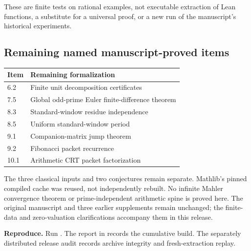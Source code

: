 These are finite tests on rational examples, not executable extraction of Lean functions, a substitute for a universal proof, or a new run of the manuscript's historical experiments.

\subsection*{Remaining named manuscript-proved items}
\begin{center}
\begin{tabular}{@{}ll@{}}\toprule
Item & Remaining formalization\\\midrule
6.2 & Finite unit decomposition certificates\\
7.5 & Global odd-prime Euler finite-difference theorem\\
8.3 & Standard-window residue independence\\
8.5 & Uniform standard-window period\\
9.1 & Companion-matrix jump theorem\\
9.2 & Fibonacci packet recurrence\\
10.1 & Arithmetic CRT packet factorization\\\bottomrule
\end{tabular}
\end{center}
The three classical inputs and two conjectures remain separate. Mathlib's pinned compiled cache was reused, not independently rebuilt. No infinite Mahler convergence theorem or prime-independent arithmetic spine is proved here. The original manuscript and three earlier supplements remain unchanged; the finite-data and zero-valuation clarifications accompany them in this release.

\textbf{Reproduce.} Run . The report in  records the cumulative build. The separately distributed release audit records archive integrity and fresh-extraction replay.

